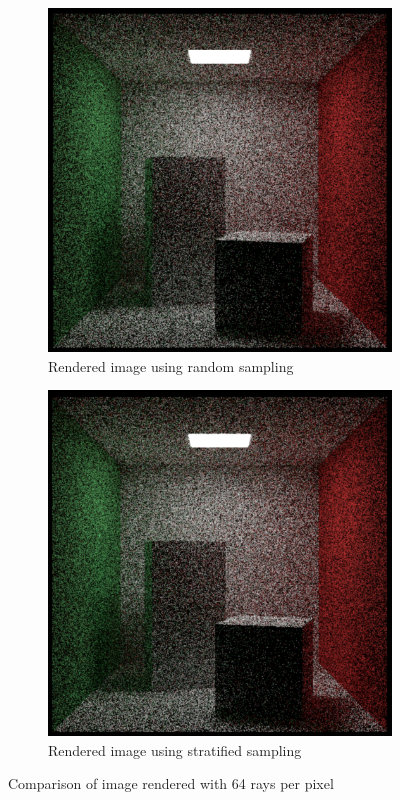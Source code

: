 \documentclass[12pt]{article}
\begin{document}
\begin{figure}[H]
    \centering
    \begin{subfigure}[b]{0.45\textwidth}
        \centering
        \includegraphics[width=\textwidth]{images/strat vs non/1sam64tim.png}
        \caption{Rendered image using random sampling}
        \label{fig:randomsamplesno_strat}
    \end{subfigure}
    \hfill
    \begin{subfigure}[b]{0.45\textwidth}
        \centering
        \includegraphics[width=\textwidth]{images/strat vs non/64sam1tim.png}
        \caption{Rendered image using stratified sampling}
        \label{fig:stratified_sampling}
    \end{subfigure}
    \caption{Comparison of image rendered with 64 rays per pixel}
    \label{fig:strat_comparison}
\end{figure}
\end{document}
